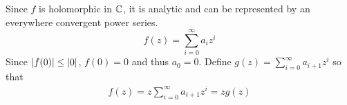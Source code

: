 \documentclass{homework}
\begin{document}
                                                                                                                                                                                                                                                                                        \begin{solution}

                                                                                                                                                                                                                                                                                        Since $f$ is holomorphic in $\mathbb{C}$, it is analytic and can be represented by an everywhere convergent power series.
                                                                                                                                                                                                                                                                                        \[
                                                                                                                                                                                                                                                                                        f(z) = \sum_{i=0}^\infty a_iz^i
                                                                                                                                                                                                                                                                                        \]
                                                                                                                                                                                                                                                                                        Since $\left|f(0)\right| \leq \left|0\right|$, $f(0)=0$ and thus $a_0=0$. Define $g(z) = \sum_{i=0}^\infty a_{i+1}z^i$ so that
                                                                                                                                                                                                                                                                                        \begin{align}\label{f_z_is_z_g_z}
                                                                                                                                                                                                                                                                                        f(z) = z\sum_{i=0}^\infty a_{i+1}z^i = zg(z)
                                                                                                                                                                                                                                                                                        \end{align}


\end{solution}
\end{document}
